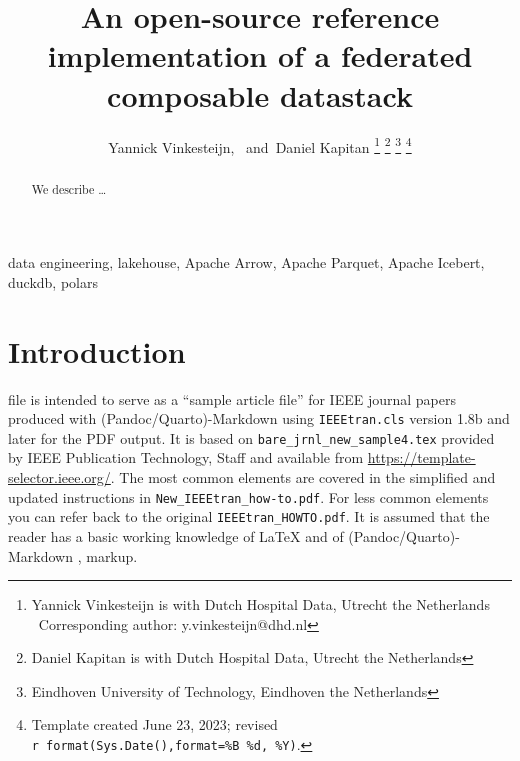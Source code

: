 \documentclass[
  journal,
]{IEEEtran}%
\title{An open-source reference implementation of a federated composable
datastack}
\author{
Yannick
Vinkesteijn\orcidlink{0009-0009-7761-5381},~\IEEEmembership{Member,
IEEE}
and~Daniel Kapitan\orcidlink{0000-0001-8979-9194}%
\thanks{Yannick Vinkesteijn is with Dutch Hospital Data, Utrecht the
Netherlands%
  Corresponding author: y.vinkesteijn@dhd.nl
}
\thanks{Daniel Kapitan is with Dutch Hospital Data, Utrecht the
Netherlands%
}
\thanks{Eindhoven University of Technology, Eindhoven the Netherlands}
\thanks{Template created June 23, 2023; revised
\texttt{r\ format(Sys.Date(),format=\textquotesingle{}\%B\ \%d,\ \%Y\textquotesingle{})}.}
}
\theoremstyle{plain}
\theoremstyle{remark}
\begin{document}


\maketitle

\begin{abstract}
We describe \ldots{}
\end{abstract}
\begin{IEEEkeywords}
data engineering, lakehouse, Apache Arrow, Apache Parquet, Apache
Icebert, duckdb, polars
\end{IEEEkeywords}

%


\section{Introduction}\label{sec-intro}

 file is intended to serve as a ``sample article
file'' for IEEE journal papers produced with (Pandoc/Quarto)-Markdown
using \texttt{IEEEtran.cls} version 1.8b and later for the PDF output.
It is based on \texttt{bare\_jrnl\_new\_sample4.tex} provided by IEEE
Publication Technology, Staff and available from
\url{https://template-selector.ieee.org/}. The most common elements are
covered in the simplified and updated instructions in
\texttt{New\_IEEEtran\_how-to.pdf}. For less common elements you can
refer back to the original \texttt{IEEEtran\_HOWTO.pdf}. It is assumed
that the reader has a basic working knowledge of {\LaTeX}
 and of
(Pandoc/Quarto)-Markdown ,
 markup.
\end{document}
